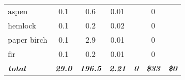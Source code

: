 \documentclass[landscape]{article}
\begin{document}
\begin{table}[H]
\begin{tabular}[t]{lcccccc}
aspen & 0.1 & 0.6 & 0.01 &  & 0 & \\
 
\rowcolor{gray!6}  hemlock & 0.1 & 0.2 & 0.02 &  & 0 & \\
 
paper birch & 0.1 & 2.9 & 0.01 &  & 0 & \\
 
\rowcolor{gray!6}  fir & 0.1 & 0.2 & 0.01 &  & 0 & \\
 
\rowcolor[HTML]{DCDCDC}  \em{\textbf{total}} & \em{\textbf{29.0}} & \em{\textbf{196.5}} & \em{\textbf{2.21}} & \em{\textbf{0}} & \em{\textbf{\$33}} & \em{\textbf{\$0}}\\
\bottomrule
\end{tabular}
\end{table}
\end{document}
